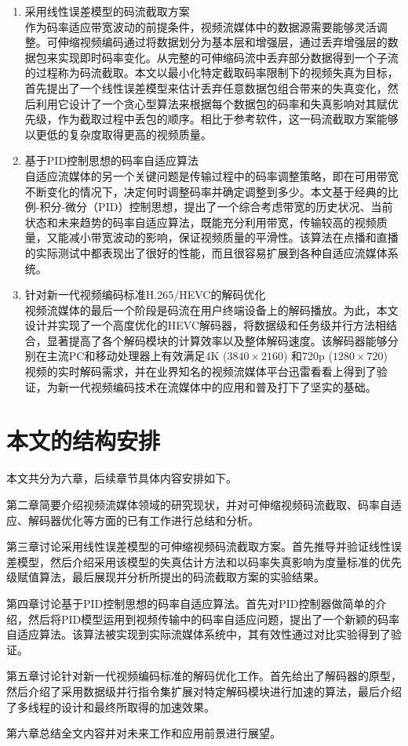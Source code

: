 \begin{enumerate}
	\item {采用线性误差模型的码流截取方案}\\
	作为码率适应带宽波动的前提条件，视频流媒体中的数据源需要能够灵活调整。可伸缩视频编码通过将数据划分为基本层和增强层，通过丢弃增强层的数据包来实现即时码率变化。从完整的可伸缩码流中丢弃部分数据得到一个子流的过程称为码流截取。本文以最小化特定截取码率限制下的视频失真为目标，首先提出了一个线性误差模型来估计丢弃任意数据包组合带来的失真变化，然后利用它设计了一个贪心型算法来根据每个数据包的码率和失真影响对其赋优先级，作为截取过程中丢包的顺序。相比于参考软件，这一码流截取方案能够以更低的复杂度取得更高的视频质量。
	\item {基于PID控制思想的码率自适应算法}\\
	自适应流媒体的另一个关键问题是传输过程中的码率调整策略，即在可用带宽不断变化的情况下，决定何时调整码率并确定调整到多少。本文基于经典的比例-积分-微分（PID）控制思想，提出了一个综合考虑带宽的历史状况、当前状态和未来趋势的码率自适应算法，既能充分利用带宽，传输较高的视频质量，又能减小带宽波动的影响，保证视频质量的平滑性。该算法在点播和直播的实际测试中都表现出了很好的性能，而且很容易扩展到各种自适应流媒体系统。
	\item {针对新一代视频编码标准H.265/HEVC的解码优化}\\
	视频流媒体的最后一个阶段是码流在用户终端设备上的解码播放。为此，本文设计并实现了一个高度优化的HEVC解码器，将数据级和任务级并行方法相结合，显著提高了各个解码模块的计算效率以及整体解码速度。该解码器能够分别在主流PC和移动处理器上有效满足4K ($3840 \times 2160$) 和720p ($1280 \times 720$) 视频的实时解码需求，并在业界知名的视频流媒体平台迅雷看看上得到了验证，为新一代视频编码技术在流媒体中的应用和普及打下了坚实的基础。 
\end{enumerate}

\section{本文的结构安排}

本文共分为六章，后续章节具体内容安排如下。

第二章简要介绍视频流媒体领域的研究现状，并对可伸缩视频码流截取、码率自适应、解码器优化等方面的已有工作进行总结和分析。

第三章讨论采用线性误差模型的可伸缩视频码流截取方案。首先推导并验证线性误差模型，然后介绍采用该模型的失真估计方法和以码率失真影响为度量标准的优先级赋值算法，最后展现并分析所提出的码流截取方案的实验结果。

第四章讨论基于PID控制思想的码率自适应算法。首先对PID控制器做简单的介绍，然后将PID模型运用到视频传输中的码率自适应问题，提出了一个新颖的码率自适应算法。该算法被实现到实际流媒体系统中，其有效性通过对比实验得到了验证。

第五章讨论针对新一代视频编码标准的解码优化工作。首先给出了解码器的原型，然后介绍了采用数据级并行指令集扩展对特定解码模块进行加速的算法，最后介绍了多线程的设计和最终所取得的加速效果。

第六章总结全文内容并对未来工作和应用前景进行展望。